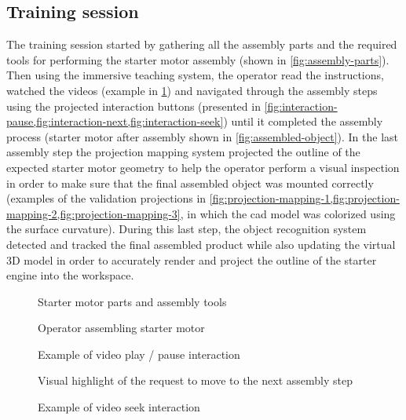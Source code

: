 \subsection{Training session}

The training session started by gathering all the assembly parts and the required tools for performing the starter motor assembly (shown in \cref{fig:assembly-parts}). Then using the immersive teaching system, the operator read the instructions, watched the videos (example in \cref{fig:assembly}) and navigated through the assembly steps using the projected interaction buttons (presented in \cref{fig:interaction-pause,fig:interaction-next,fig:interaction-seek}) until it completed the assembly process (starter motor after assembly shown in \cref{fig:assembled-object}). In the last assembly step the projection mapping system projected the outline of the expected starter motor geometry to help the operator perform a visual inspection in order to make sure that the final assembled object was mounted correctly (examples of the validation projections in \cref{fig:projection-mapping-1,fig:projection-mapping-2,fig:projection-mapping-3}, in which the \gls{cad} model was colorized using the surface curvature). During this last step, the object recognition system detected and tracked the final assembled product while also updating the virtual 3D model in order to accurately render and project the outline of the starter engine into the workspace.

\begin{figure}[ht]
	\begin{floatrow}[2]
		{\caption{Starter motor parts and assembly tools}\label{fig:assembly-parts}}
		{\caption{Operator assembling starter motor}\label{fig:assembly}}
	\end{floatrow}
\end{figure}

\begin{figure}[ht]
	\begin{floatrow}[3]
		{\caption{Example of video play / pause interaction}\label{fig:interaction-pause}}
		{\caption{Visual highlight of the request to move to the next assembly step}\label{fig:interaction-next}}
		{\caption{Example of video seek interaction}\label{fig:interaction-seek}}
	\end{floatrow}
\end{figure}

